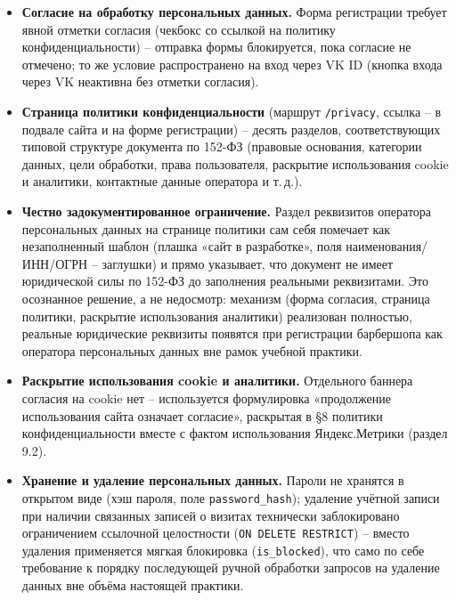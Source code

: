 \begin{itemize}
  \item \textbf{Согласие на обработку персональных данных.} Форма
        регистрации требует явной отметки согласия (чекбокс со ссылкой на
        политику конфиденциальности) -- отправка формы блокируется, пока
        согласие не отмечено; то же условие распространено на вход через
        VK ID (кнопка входа через VK неактивна без отметки согласия).
  \item \textbf{Страница политики конфиденциальности} (маршрут
        \texttt{/privacy}, ссылка -- в подвале сайта и на форме
        регистрации) -- десять разделов, соответствующих типовой структуре
        документа по 152-ФЗ (правовые основания, категории данных, цели
        обработки, права пользователя, раскрытие использования cookie и
        аналитики, контактные данные оператора и т.\,д.).
  \item \textbf{Честно задокументированное ограничение.} Раздел
        реквизитов оператора персональных данных на странице политики
        сам себя помечает как незаполненный шаблон (плашка «сайт в
        разработке», поля наименования/ИНН/ОГРН -- заглушки) и прямо
        указывает, что документ не имеет юридической силы по 152-ФЗ до
        заполнения реальными реквизитами. Это осознанное решение, а не
        недосмотр: механизм (форма согласия, страница политики,
        раскрытие использования аналитики) реализован полностью, реальные
        юридические реквизиты появятся при регистрации барбершопа как
        оператора персональных данных вне рамок учебной практики.
  \item \textbf{Раскрытие использования cookie и аналитики.} Отдельного
        баннера согласия на cookie нет -- используется формулировка
        «продолжение использования сайта означает согласие», раскрытая в
        §8 политики конфиденциальности вместе с фактом использования
        Яндекс.Метрики (раздел 9.2).
  \item \textbf{Хранение и удаление персональных данных.} Пароли не
        хранятся в открытом виде (хэш пароля, поле \texttt{password\_hash});
        удаление учётной записи при наличии связанных записей о визитах
        технически заблокировано ограничением ссылочной целостности
        (\texttt{ON DELETE RESTRICT}) -- вместо удаления применяется мягкая
        блокировка (\texttt{is\_blocked}), что само по себе требование
        к порядку последующей ручной обработки запросов на удаление
        данных вне объёма настоящей практики.
\end{itemize}

